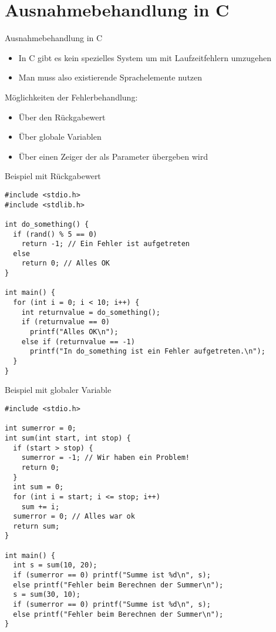 \documentclass[presentation]{beamer}
\begin{document}
\section{Ausnahmebehandlung in C}
\label{sec:orgf5689e8}
\begin{frame}[label={sec:org70d2ac6}]{Ausnahmebehandlung in C}
\begin{itemize}
\item In C gibt es \alert{kein spezielles System} um mit Laufzeitfehlern
umzugehen
\item Man muss also \alert{existierende Sprachelemente nutzen}
\end{itemize}
\begin{block}{Möglichkeiten der Fehlerbehandlung:}
\begin{itemize}
\item Über den \alert{Rückgabewert}
\item Über \alert{globale Variablen}
\item Über \alert{einen Zeiger} der als Parameter übergeben wird
\end{itemize}
\end{block}
\end{frame}
\begin{frame}[label={sec:org6bbb5c8},fragile]{Beispiel mit Rückgabewert}
 \begin{verbatim}
#include <stdio.h>
#include <stdlib.h>

int do_something() {
  if (rand() % 5 == 0)
    return -1; // Ein Fehler ist aufgetreten
  else
    return 0; // Alles OK
}

int main() {
  for (int i = 0; i < 10; i++) {
    int returnvalue = do_something();
    if (returnvalue == 0)
      printf("Alles OK\n");
    else if (returnvalue == -1)
      printf("In do_something ist ein Fehler aufgetreten.\n");
  }
}
\end{verbatim}
\end{frame}
\begin{frame}[label={sec:org0a6a458},fragile]{Beispiel mit globaler Variable}
 \begin{verbatim}
#include <stdio.h>

int sumerror = 0;
int sum(int start, int stop) {
  if (start > stop) {
    sumerror = -1; // Wir haben ein Problem!
    return 0;
  }
  int sum = 0;
  for (int i = start; i <= stop; i++)
    sum += i;
  sumerror = 0; // Alles war ok
  return sum;
}

int main() {
  int s = sum(10, 20);
  if (sumerror == 0) printf("Summe ist %d\n", s);
  else printf("Fehler beim Berechnen der Summer\n");
  s = sum(30, 10);
  if (sumerror == 0) printf("Summe ist %d\n", s);
  else printf("Fehler beim Berechnen der Summer\n");
}
\end{verbatim}
\end{frame}
\end{document}

